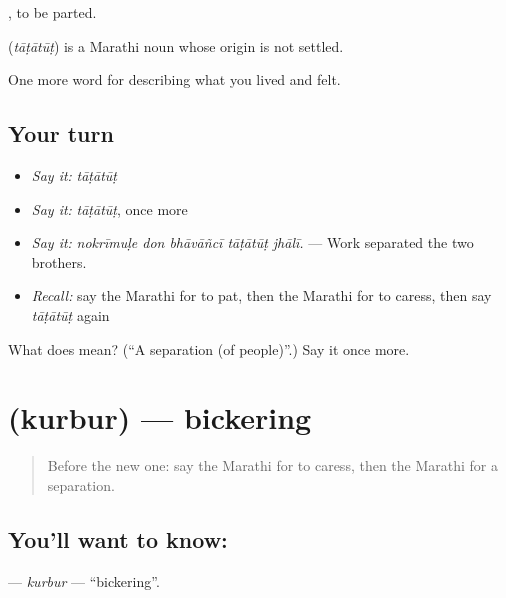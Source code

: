  , to be parted.

\begin{cousinweb}
\textbf{} (\emph{tāṭātūṭ}) is a Marathi noun whose origin is not settled.
\end{cousinweb}

\begin{grammarlens}[title={What you've built}]
One more word for describing what you lived and felt.
\end{grammarlens}

\subsection*{Your turn}
\begin{itemize}
\raggedright
  \item \emph{Say it:} \emph{tāṭātūṭ}
  \item \emph{Say it:} \emph{tāṭātūṭ}, once more
  \item \emph{Say it:} \emph{nokrīmuḷe don bhāvāñcī tāṭātūṭ jhālī.} — Work separated the two brothers.
  \item \emph{Recall:} say the Marathi for to pat, then the Marathi for to caress, then say \emph{tāṭātūṭ} again
\end{itemize}

\begin{tcolorbox}[breakable,colback=teal!4,colframe=teal!35!black,title={Before you move on}]
What does  mean? (\textquotedblleft{}A separation (of people)\textquotedblright{}.) Say it once more.
\end{tcolorbox}
\section[\texorpdfstring{\mr{कुरबुर} (kurbur)}{कुरबुर (kurbur)}]{ (kurbur) — bickering}

\label{lesson:MR-C502-kurbur}



\begin{quote}
Before the new one: say the Marathi for to caress, then the Marathi for a separation.
\end{quote}

\subsection*{You'll want to know: }
\textbf{} — \emph{kurbur} — \textquotedblleft{}bickering\textquotedblright{}.

